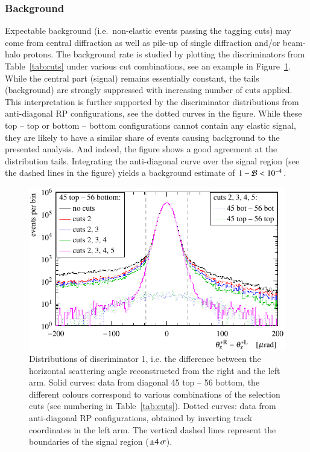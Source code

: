 
\subsubsection{Background}
\label{sec:background}

Expectable background (i.e.~non-elastic events passing the tagging cuts) may come from central diffraction as well as pile-up of single diffraction and/or beam-halo protons. The background rate is studied by plotting the discriminators from Table~\ref{tab:cuts} under various cut combinations, see an example in Figure~\ref{fig:background}. While the central part (signal) remains essentially constant, the tails (background) are strongly suppressed with increasing number of cuts applied. This interpretation is further supported by the discriminator distributions from anti-diagonal RP configurations, see the dotted curves in the figure. While these top -- top or bottom -- bottom configurations cannot contain any elastic signal, they are likely to have a similar share of events causing background to the presented analysis. And indeed, the figure shows a good agreement at the distribution tails. Integrating the anti-diagonal curve over the signal region (see the dashed lines in the figure) yields a background estimate of $1 - {\cal B} < 10^{-4}$.


\begin{figure}
\begin{center}
\includegraphics{fig/cut_distributions.pdf}
\caption{%
Distributions of discriminator 1, i.e. the difference between the horizontal scattering angle reconstructed from the right and the left arm. Solid curves: data from diagonal 45 top -- 56 bottom, the different colours correspond to various combinations of the selection cuts (see numbering in Table~\ref{tab:cuts}). Dotted curves: data from anti-diagonal RP configurations, obtained by inverting track coordinates in the left arm. The vertical dashed lines represent the boundaries of the signal region ($\pm 4\,{\rm \sigma}$).
}
\label{fig:background}
\end{center}
\end{figure}

